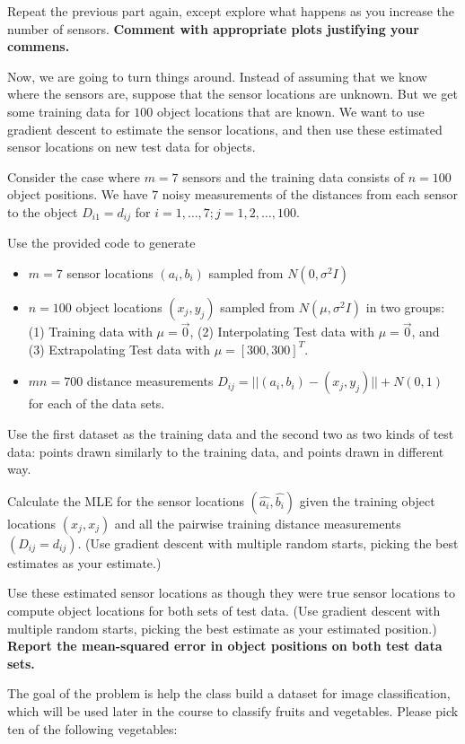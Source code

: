 \begin{Parts}
\Part Repeat the previous part again, except explore what happens as you
increase the number of sensors. {\bf Comment with appropriate plots
  justifying your commens.}

\Part Now, we are going to turn things around. Instead of assuming
that we know where the sensors are, suppose that the sensor locations
are unknown. But we get some training data for $100$ object
locations that are known. We want to use gradient descent to estimate
the sensor locations, and then use these estimated sensor locations on
new test data for objects. 

Consider the case where $m=7$ sensors and the training data consists
of $n=100$ object positions. We have $7$ noisy measurements of the
distances from each sensor to the object 
$D_{i1}=d_{ij}$ for $i=1,\dots,7;j=1,2,\dots,100$.  

Use the provided code to generate 
  \begin{itemize}
    \item $m=7$ sensor locations $(a_i, b_i)$ sampled from $N(0, \sigma^2 I)$
    \item $n=100$ object locations $(x_j, y_j)$ sampled from $N(\mu,
      \sigma^2 I)$  in two groups: (1) Training data with $\mu =
      \vec{0}$, (2) Interpolating Test data with $\mu = \vec{0}$, and
      (3) Extrapolating Test data with $\mu = [300,300]^T$. 

    \item $mn=700$ distance measurements $D_{ij} =
      ||(a_i,b_i)-(x_j,y_j)|| + N(0, 1)$ for each of the data sets. 
  \end{itemize}
Use the first dataset as the training data and the second two as two
kinds of test data: points drawn similarly to the training data, and
points drawn in different way.

Calculate the MLE for the sensor locations $(\hat{a_i},\hat{b_i})$
given the training object locations $(x_j,x_j)$ and all the pairwise
training distance measurements $(D_{ij}=d_{ij})$. (Use gradient
descent with multiple random starts, picking the best estimates as
your estimate.)  

Use these estimated sensor locations as though they were true sensor
locations to compute object locations for both sets of test data. (Use
gradient descent with multiple random starts, picking the best
estimate as your estimated position.) {\bf Report the mean-squared
  error in object positions on both test data sets.}









  




\end{Parts} 
The goal of the problem is help the class build a dataset for image classification, which will be used later in the course to classify fruits and vegetables. Please pick ten of the following vegetables:

